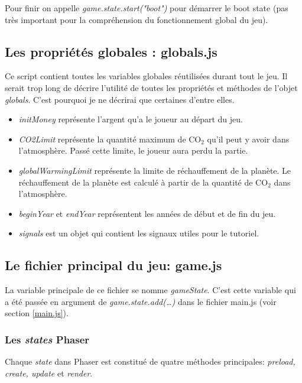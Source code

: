 \documentclass{article}
\begin{document}
		
		Pour finir on appelle \textit{game.state.start("boot")} pour démarrer le boot state (pas très important pour la compréhension du fonctionnement global du jeu).
		
		\subsection{Les propriétés globales : globals.js}
		
		Ce script contient toutes les variables globales réutilisées durant tout le jeu. Il serait trop long de décrire l'utilité de toutes les propriétés et méthodes de l'objet \textit{globals}. C'est pourquoi je ne décrirai que certaines d'entre elles.
		
		\begin{itemize}
			\item \textit{initMoney} représente l'argent qu'a le joueur au départ du jeu.
			\item \textit{CO2Limit} représente la quantité maximum de CO$_{2}$ qu'il peut y avoir dans l'atmosphère. Passé cette limite, le joueur aura perdu la partie.
			\item \textit{globalWarmingLimit} représente la limite de réchauffement de la planète. Le réchauffement de la planète est calculé à partir de la quantité de CO$_{2}$ dans l'atmosphère.
			\item \textit{beginYear} et \textit{endYear} représentent les années de début et de fin du jeu.
			\item \textit{signals} est un objet qui contient les signaux utiles pour le tutoriel.
		\end{itemize}
		
		\subsection{Le fichier principal du jeu: game.js}
		
		La variable principale de ce fichier se nomme \textit{gameState}. C'est cette variable qui a été passée en argument de \textit{game.state.add(\dots)} dans le fichier main.js (voir section \ref{main.js}).
		
		\subsubsection{Les \textit{states} Phaser}
		Chaque \textit{state} dans Phaser est constitué de quatre méthodes principales: \textit{preload, create, update} et \textit{render}. 
		
\end{document}
